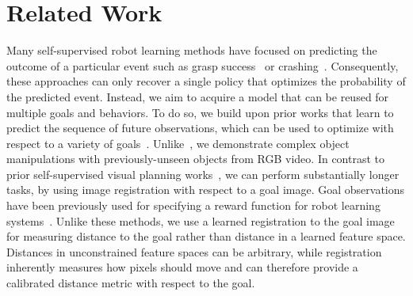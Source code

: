 \vspace{-0.1cm}
\section{Related Work}
\vspace{-0.1cm}


Many self-supervised robot learning methods have focused on predicting the outcome of a particular event such as grasp success~\cite{lerrel,google_handeye,princeton_pushgrasp} or crashing~\cite{crashing,greg_kahn_uncertainty}. Consequently, these approaches can only recover a single policy that optimizes the probability of the predicted event. Instead, we aim to acquire a model that can be reused for multiple goals and behaviors. To do so, we build upon prior works that learn to predict the sequence of future observations, which can be used to optimize with respect to a variety of goals~\cite{foresight,sna,se3_control}. Unlike~\citet{se3_control}, we demonstrate complex object manipulations with previously-unseen objects from RGB video. In contrast to prior self-supervised visual planning works~\cite{foresight,sna}, we can perform substantially longer tasks, by using image registration with respect to a goal image.
Goal observations have been previously used for specifying a reward function for robot learning systems~\cite{jagersand1995visual,deguchi1999image,e2c,dsae}. Unlike these methods, we use a learned registration to the goal image for measuring distance to the goal rather than distance in a learned feature space. Distances in unconstrained feature spaces can be arbitrary, while registration inherently measures how pixels should move and can therefore provide a calibrated distance metric with respect to the goal. 

